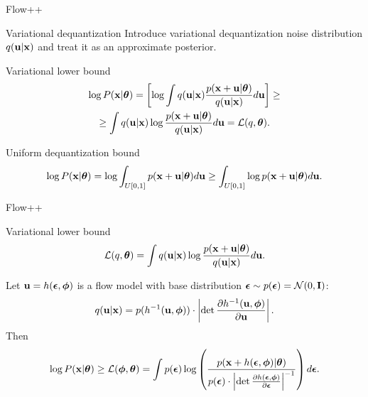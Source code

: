 \begin{frame}{Flow++}
	\begin{block}{Variational dequantization}
		Introduce variational dequantization noise distribution $q(\mathbf{u} | \mathbf{x})$ and treat it as an approximate posterior. 
	\end{block}
	\begin{block}{Variational lower bound}
		\vspace{-0.7cm}
		\begin{multline*}
		 \log P(\mathbf{x} | \boldsymbol{\theta}) = \left[ \log \int q(\mathbf{u} | \mathbf{x}) \frac{p(\mathbf{x} + \mathbf{u} | \boldsymbol{\theta})}{q(\mathbf{u} | \mathbf{x})} d \mathbf{u} \right] \geq \\ 
			\geq  \int q(\mathbf{u} | \mathbf{x}) \log \frac{p(\mathbf{x} + \mathbf{u} | \boldsymbol{\theta})}{q(\mathbf{u} | \mathbf{x})} d \mathbf{u} = \mathcal{L}(q, \boldsymbol{\theta}).
		\end{multline*}
	\end{block}
	\vspace{-0.5cm}
	\begin{block}{Uniform dequantization bound}
		\vspace{-0.4cm}
		\[
		 \log P(\mathbf{x} | \boldsymbol{\theta}) = \log \int_{U[0, 1]} p(\mathbf{x} + \mathbf{u} | \boldsymbol{\theta}) d \mathbf{u} \geq \int_{U[0, 1]} \log p(\mathbf{x} + \mathbf{u} | \boldsymbol{\theta}) d \mathbf{u}.
		\]
	\end{block}
\end{frame}
\begin{frame}{Flow++}
	\begin{block}{Variational lower bound}
		\[
		\mathcal{L}(q, \boldsymbol{\theta}) = \int q(\mathbf{u} | \mathbf{x}) \log \frac{p(\mathbf{x} + \mathbf{u} | \boldsymbol{\theta})}{q(\mathbf{u} | \mathbf{x})} d \mathbf{u}.
		\]
	\end{block}
	Let $\mathbf{u} = h(\boldsymbol{\epsilon}, \boldsymbol{\phi})$ is a flow model with base distribution $\boldsymbol{\epsilon} \sim p(\boldsymbol{\epsilon}) = \mathcal{N}(0, \mathbf{I})$:
	\vspace{-0.3cm}
	\[
		q(\mathbf{u} | \mathbf{x}) = p(h^{-1}(\mathbf{u}, \boldsymbol{\phi})) \cdot \left| \det \frac{\partial h^{-1}(\mathbf{u}, \boldsymbol{\phi})}{\partial \mathbf{u}}\right|.
	\]
	\vspace{-0.3cm}
	Then
	\[
		\log P(\mathbf{x} | \boldsymbol{\theta}) \geq \mathcal{L}(\boldsymbol{\phi}, \boldsymbol{\theta}) = \int p(\boldsymbol{\epsilon}) \log \left( \frac{p(\mathbf{x} + h(\boldsymbol{\epsilon}, \boldsymbol{\phi}) | \boldsymbol{\theta})}{p(\boldsymbol{\epsilon}) \cdot \left| \det \frac{\partial h(\boldsymbol{\epsilon}, \boldsymbol{\phi})}{\partial \boldsymbol{\epsilon}}\right|^{-1}} \right) d\boldsymbol{\epsilon}.
	\]
\end{frame}
